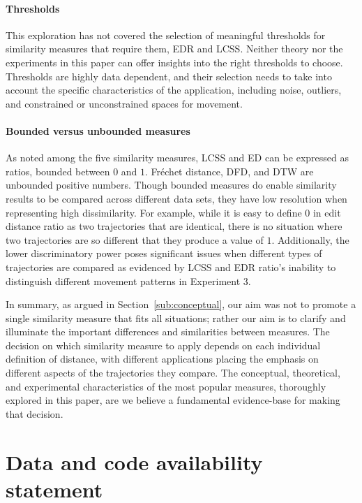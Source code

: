 \documentclass{interact}
\begin{document}
\paragraph*{Thresholds} This exploration has not  covered the selection of meaningful thresholds  for similarity  measures that require them, EDR and LCSS. Neither theory nor the experiments in this  paper can offer insights into the right thresholds to choose. Thresholds are highly data dependent,  and their selection needs to take into account the specific characteristics of the application, including noise, outliers, and constrained or unconstrained spaces for movement.

\paragraph*{Bounded versus unbounded measures}
As noted among the five similarity measures, LCSS and ED can be expressed as ratios, bounded between $0$ and $1$. Fréchet distance, DFD, and DTW are unbounded positive numbers. Though bounded measures do enable similarity results to be compared across different data sets, they have low resolution when representing high dissimilarity. For example, while it is easy to define 0 in edit distance ratio as two trajectories that are identical, there is no situation where two trajectories are so different that they produce a value of $1$. Additionally, the lower discriminatory power poses significant issues when different types of trajectories are compared as evidenced by LCSS and EDR ratio's inability to distinguish different movement patterns in Experiment 3.

\bigskip

In summary, as argued in Section~\ref{sub:conceptual}, our aim was not to promote a single similarity measure that fits all situations; rather  our aim is to clarify and illuminate the important differences and similarities between measures. The decision on which similarity measure to apply depends on each individual definition of distance, with different applications placing  the emphasis on different aspects of the trajectories they compare. The conceptual, theoretical, and experimental characteristics of the most popular measures, thoroughly explored in this paper, are we believe a fundamental evidence-base for making that decision. 

\section*{Data and code availability statement}
\end{document}
